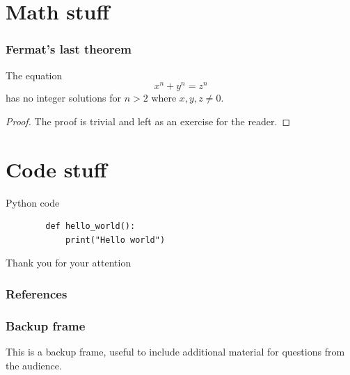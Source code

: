 \documentclass{beamer}
\begin{document}
\section{Math stuff}
\begin{frame}
	\frametitle{Fermat's last theorem}
	\begin{theorem}
		The equation
		$$
		x^n+y^n=z^n
		$$
		has no integer solutions for $n > 2$ where $x, y, z \neq 0$.
	\end{theorem}
	\pause
	\begin{proof}
		The proof is trivial and left as an exercise for the reader.
	\end{proof}
\end{frame}

\section{Code stuff}
\begin{frame}[fragile]{Python code}
	\begin{verbatim}
		def hello_world():
			print("Hello world")
	\end{verbatim}
\end{frame}


\appendix

\begin{frame}[standout]
	Thank you for your attention
\end{frame}

\begin{frame}
	\frametitle{References}
	\nocite{*}
    
    
\end{frame}

\begin{frame}
	\frametitle{Backup frame}
	This is a backup frame, useful to include additional material for questions from the audience.
\end{frame}
\end{document}
